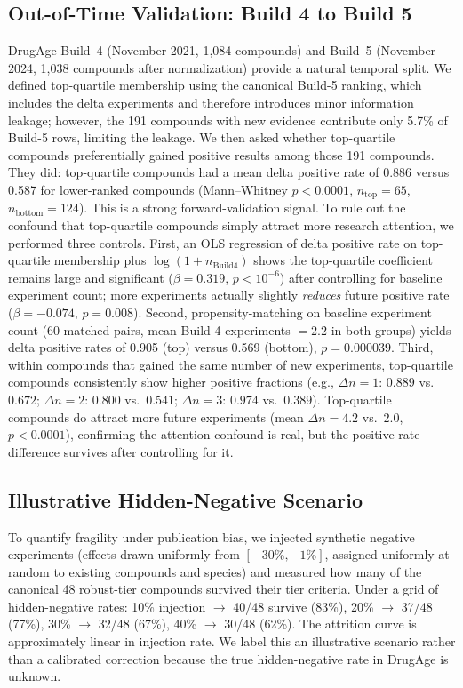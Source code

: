 \documentclass[11pt]{article}
\begin{document}
\subsection{Out-of-Time Validation: Build 4 to Build 5}
DrugAge Build~4 (November 2021, 1{,}084 compounds) and Build~5 (November 2024, 1{,}038 compounds after normalization) provide a natural temporal split. We defined top-quartile membership using the canonical Build-5 ranking, which includes the delta experiments and therefore introduces minor information leakage; however, the 191 compounds with new evidence contribute only 5.7\% of Build-5 rows, limiting the leakage. We then asked whether top-quartile compounds preferentially gained positive results among those 191 compounds. They did: top-quartile compounds had a mean delta positive rate of 0.886 versus 0.587 for lower-ranked compounds (Mann--Whitney $p < 0.0001$, $n_{\text{top}} = 65$, $n_{\text{bottom}} = 124$). This is a strong forward-validation signal. To rule out the confound that top-quartile compounds simply attract more research attention, we performed three controls. First, an OLS regression of delta positive rate on top-quartile membership plus $\log(1 + n_{\text{Build4}})$ shows the top-quartile coefficient remains large and significant ($\beta = 0.319$, $p < 10^{-6}$) after controlling for baseline experiment count; more experiments actually slightly \emph{reduces} future positive rate ($\beta = -0.074$, $p = 0.008$). Second, propensity-matching on baseline experiment count (60 matched pairs, mean Build-4 experiments $= 2.2$ in both groups) yields delta positive rates of 0.905 (top) versus 0.569 (bottom), $p = 0.000039$. Third, within compounds that gained the same number of new experiments, top-quartile compounds consistently show higher positive fractions (e.g., $\Delta n = 1$: $0.889$ vs.\ $0.672$; $\Delta n = 2$: $0.800$ vs.\ $0.541$; $\Delta n = 3$: $0.974$ vs.\ $0.389$). Top-quartile compounds do attract more future experiments (mean $\Delta n = 4.2$ vs.\ $2.0$, $p < 0.0001$), confirming the attention confound is real, but the positive-rate difference survives after controlling for it.

\subsection{Illustrative Hidden-Negative Scenario}
To quantify fragility under publication bias, we injected synthetic negative experiments (effects drawn uniformly from $[-30\%, -1\%]$, assigned uniformly at random to existing compounds and species) and measured how many of the canonical 48 robust-tier compounds survived their tier criteria. Under a grid of hidden-negative rates: 10\% injection $\rightarrow$ 40/48 survive (83\%), 20\% $\rightarrow$ 37/48 (77\%), 30\% $\rightarrow$ 32/48 (67\%), 40\% $\rightarrow$ 30/48 (62\%). The attrition curve is approximately linear in injection rate. We label this an illustrative scenario rather than a calibrated correction because the true hidden-negative rate in DrugAge is unknown.
\end{document}
